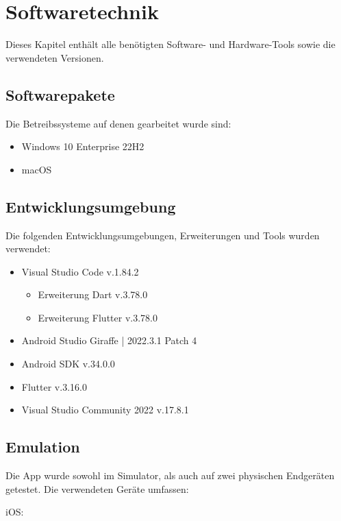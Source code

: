 
\chapter{Softwaretechnik}

Dieses Kapitel enthält alle benötigten Software- und Hardware-Tools sowie die verwendeten Versionen.

\section{Softwarepakete}

Die Betreibssysteme auf denen gearbeitet wurde sind:

\begin{itemize}
  \item Windows 10 Enterprise 22H2
  \item macOS
\end{itemize}

\section{Entwicklungsumgebung}

Die folgenden Entwicklungsumgebungen, Erweiterungen und Tools wurden verwendet:

\begin{itemize}
  \item Visual Studio Code v.1.84.2
  \begin{itemize}
    \item Erweiterung Dart v.3.78.0
    \item Erweiterung Flutter v.3.78.0
  \end{itemize}
  \item Android Studio Giraffe | 2022.3.1 Patch 4
  \item Android SDK v.34.0.0
  \item Flutter v.3.16.0
  \item Visual Studio Community 2022 v.17.8.1
\end{itemize}


\section{Emulation}

Die App wurde sowohl im Simulator, als auch auf zwei physischen Endgeräten getestet.
Die verwendeten Geräte umfassen:

iOS:


